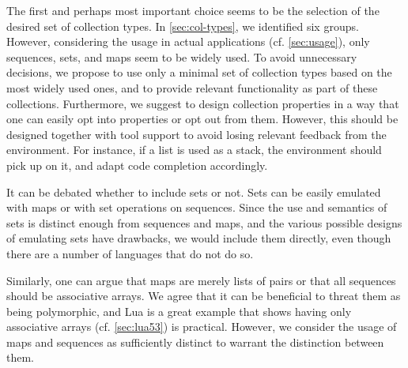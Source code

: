 \documentclass[sigconf, authorversion]{acmart}
\begin{document}
The first and perhaps most important choice seems to be the selection of the
desired set of collection types.
In \cref{sec:col-types}, we identified six groups.
However, considering the usage in actual applications (cf. \cref{sec:usage}),
only sequences, sets, and maps seem to be widely used.
To avoid unnecessary decisions,
we propose to use only a minimal set of collection types
based on the most widely used ones,
and to provide relevant functionality as part of these collections.
Furthermore, we suggest to design collection properties
in a way that one can easily opt into properties or opt out from them.
However, this should be designed together with tool support
to avoid losing relevant feedback from the environment.
For instance, if a list is used as a stack,
the environment should pick up on it,
and adapt code completion accordingly.

It can be debated whether to include sets or not.
Sets can be easily emulated with maps
 or with set operations on sequences.
Since the use and semantics of sets is distinct enough from sequences and maps,
and the various possible designs of emulating sets have drawbacks,
we would %
include them directly,
even though there are a number of languages that do not do so.

Similarly, one can argue that maps are merely lists of pairs
or that all sequences should be associative arrays.
We agree that it can be beneficial to threat them as being polymorphic,
and Lua is a great example that shows having only associative arrays
(cf. \cref{sec:lua53}) is practical.
However, we consider the usage of maps and sequences
as sufficiently distinct to warrant
the distinction between them. 
\end{document}
